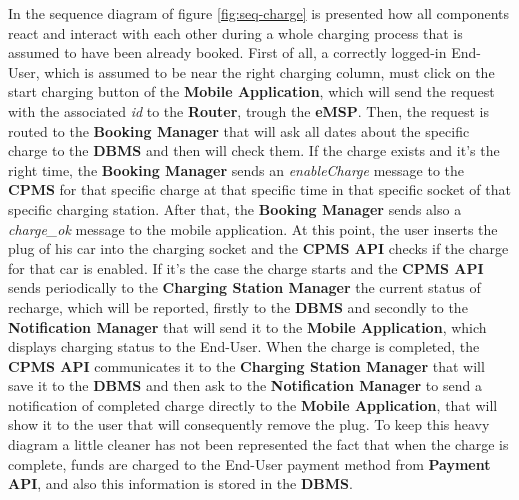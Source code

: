 \documentclass[a4paper]{report}
\begin{document}
In the sequence diagram of figure \ref{fig:seq-charge} is presented how all components react and interact with each other during a whole charging process that is assumed to have been already booked. First of all, a correctly logged-in End-User, which is assumed to be near the right charging column, must click on the start charging button of the \textbf{Mobile Application}, which will send the request with the associated \textit{id} to the \textbf{Router}, trough the \textbf{eMSP}. Then, the request is routed to the \textbf{Booking Manager} that will ask all dates about the specific charge to the \textbf{DBMS} and then will check them. If the charge exists and it's the right time, the \textbf{Booking Manager} sends an \textit{enableCharge} message to the \textbf{CPMS} for that specific charge at that specific time in that specific socket of that specific charging station. After that, the \textbf{Booking Manager} sends also a \textit{charge\_ok} message to the mobile application. At this point, the user inserts the plug of his car into the charging socket and the \textbf{CPMS API} checks if the charge for that car is enabled. If it's the case the charge starts and the \textbf{CPMS API} sends periodically to the \textbf{Charging Station Manager} the current status of recharge, which will be reported, firstly to the \textbf{DBMS} and secondly to the \textbf{Notification Manager} that will send it to the \textbf{Mobile Application}, which displays charging status to the End-User. When the charge is completed, the \textbf{CPMS API} communicates it to the \textbf{Charging Station Manager} that will save it to the \textbf{DBMS} and then ask to the \textbf{Notification Manager} to send a notification of completed charge directly to the \textbf{Mobile Application}, that will show it to the user that will consequently remove the plug. To keep this heavy diagram a little cleaner has not been represented the fact that when the charge is complete, funds are charged to the End-User payment method from \textbf{Payment API}, and also this information is stored in the \textbf{DBMS}.
\\\\
\end{document}
